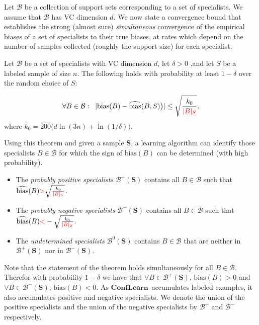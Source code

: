 \documentclass{colt2015} %
\newcommand{\new}[1]{\textcolor{red}{#1}}
\newcommand{\cB}{\mathcal{B}}
\newcommand{\ActiveLearn}{$\mathbf{ConfLearn}$}
\newcommand{\samp}{S}
\newcommand{\bias}{\text{bias}}
\newcommand{\ebias}{\widehat{\text{bias}}}
\begin{document}
Let $\cB$ be a collection of support sets corresponding to a set of
specialists. We assume that $\cB$ has VC dimension $d$. We now state a
convergence bound that establishes the strong (almost sure)
\emph{simultaneous} convergence of the empirical biases of a set of
specialists to their true biases, at rates which depend on the number
of samples collected (roughly the support size) for each specialist.

\begin{theorem}\label{thm:UCECM}
Let $\cB$ be a set of specialists with VC dimension $d$, let
$\delta>0$ ,and let $\samp$ be a labeled sample of size $n$.  The
following holds with probability at least $1-\delta$ over the random
choice of $\samp$:

\[\forall B\in\cB :\;\;
\lvert \bias(B) - \ebias(B,\samp) \bigr) \rvert
\leq \sqrt{\frac{k_0}{\new{\lvert B\rvert_S}}},
\]
where $k_0 =200\bigl(d\ln(3n) + \ln(1/\delta)\bigr)$.
\end{theorem}


\newcommand{\sample}[1]{{\mathbf #1}}
\newcommand{\constr}[3]{#1 \left(#2,\sample{#3}\right)}
  
Using this theorem and given a sample $\sample{S}$, 
a learning algorithm can identify those specialists $B \in \cB$ for which the sign of
$\bias(B)$ can be determined (with high probability). 
\begin{itemize}
\item The \emph{probably positive specialists} $\cB^{+} (\sample{S})$ contains all $B \in \cB$ such that
  $\ebias(B) \new{>} \sqrt{\frac{k_0}{\new{\lvert B\rvert_S}}}$.
\item The \emph{probably negative specialists} $\cB^{-} (\sample{S})$ contains all $B \in \cB$ such that
  $\ebias(B) \new{<} -\sqrt{\frac{k_0}{\new{\lvert B\rvert_S}}}$.
\item The \emph{undetermined specialists} $\cB^{0} (\sample{S})$ contains $B \in \cB$ that are neither in
  $\cB^{+} (\sample{S})$ nor in $\cB^{-} (\sample{S})$.
\end{itemize}

Note that the statement of the theorem holds simultaneously for all $B \in
\cB$. Therefor with probability $1-\delta$ we have that $\forall B \in
\cB^{+} (\sample{S})$, $\bias(B)>0$ and $\forall B \in \cB^{-}
(\sample{S})$, $\bias(B)<0$. As \ActiveLearn\ accumulates labeled
examples, it also accumulates positive and negative specialists. We
denote the union of the positive specialists and the union of the negative
specialists by $\cB^+$ and $\cB^-$ respectively.
\end{document}
